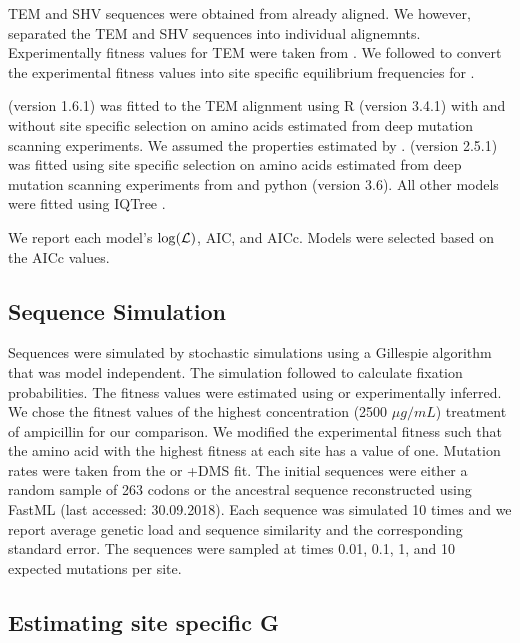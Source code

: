 \documentclass[12pt]{article}
\begin{document}
TEM and SHV sequences were obtained from \citet{bloom2017} already aligned.
We however, separated the TEM and SHV sequences into individual alignemnts.
Experimentally fitness values for TEM were taken from \citet{stiffler2016}.
We followed \citep{bloom2017} to convert the experimental fitness values into site specific equilibrium frequencies for \phydms. 

\selac (version 1.6.1) was fitted to the TEM alignment using R (version 3.4.1) \citep{rcore} with and without site specific selection on amino acids estimated from deep mutation scanning experiments.
We assumed the \PC properties estimated by \citet{grantham1974}.
\phydms (version 2.5.1) was fitted using site specific selection on amino acids estimated from deep mutation scanning experiments from \citet{stiffler2016} and python (version 3.6).
All other models were fitted using IQTree \citep{nguyen2015}.

We report each model's $\log(\mathcal{L})$, AIC, and  AICc. 
Models were selected based on the AICc values.

\subsection*{Sequence Simulation}

Sequences were simulated by stochastic simulations using a Gillespie algorithm \citep{gillespie1976} that was model independent.
The simulation followed \citet{SellaAndHirsh2005} to calculate fixation probabilities.
The fitness values were estimated using \selac or experimentally inferred.
We chose the fitnest values of the highest concentration (2500 $\mu g/mL$) treatment of ampicillin for our comparison.
We modified the experimental fitness such that the amino acid with the highest fitness at each site has a value of one.
Mutation rates were taken from the \selac or \selac+DMS fit.
The initial sequences were either a random sample of 263 codons or the ancestral sequence reconstructed using FastML \citep{fastml} (last accessed: 30.09.2018).
Each sequence was simulated 10 times and we report average genetic load and sequence similarity and the corresponding standard error.
The sequences were sampled at times 0.01, 0.1, 1, and 10 expected mutations per site.

\subsection*{Estimating site specific G}
\end{document}
